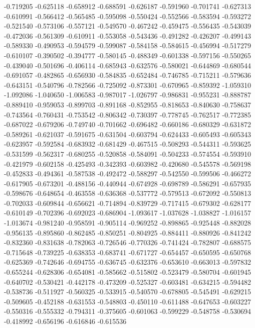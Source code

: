 -0.719205
-0.625118
-0.658912
-0.688591
-0.626187
-0.591960
-0.701741
-0.627313
-0.610991
-0.566412
-0.565485
-0.595098
-0.550424
-0.552566
-0.583594
-0.593272
-0.521540
-0.573106
-0.557121
-0.549570
-0.467242
-0.459475
-0.556435
-0.543039
-0.472036
-0.561309
-0.610911
-0.553058
-0.543436
-0.491282
-0.426207
-0.499143
-0.589330
-0.490953
-0.594579
-0.599087
-0.584158
-0.584615
-0.456994
-0.517279
-0.610107
-0.390502
-0.394777
-0.580145
-0.488349
-0.601338
-0.597156
-0.550265
-0.439040
-0.501696
-0.406114
-0.685943
-0.632576
-0.580021
-0.644869
-0.680544
-0.691057
-0.482865
-0.656930
-0.584835
-0.652484
-0.746785
-0.715211
-0.579636
-0.643151
-0.540796
-0.782566
-0.725092
-0.873301
-0.670965
-0.859392
-1.059310
-1.092086
-1.040650
-1.006583
-0.987017
-1.026797
-0.986831
-0.955231
-0.888787
-0.889410
-0.959053
-0.899703
-0.891168
-0.852955
-0.818653
-0.840630
-0.758637
-0.743564
-0.760431
-0.753542
-0.806342
-0.730397
-0.778745
-0.762517
-0.772385
-0.687022
-0.679206
-0.749740
-0.701662
-0.696482
-0.660186
-0.680329
-0.631872
-0.589261
-0.621037
-0.591675
-0.631504
-0.603794
-0.624433
-0.605493
-0.605343
-0.623957
-0.592584
-0.683932
-0.681429
-0.467515
-0.508293
-0.544311
-0.593625
-0.531599
-0.562317
-0.680255
-0.520858
-0.584091
-0.504233
-0.574554
-0.593910
-0.421979
-0.602158
-0.425493
-0.342393
-0.603982
-0.420680
-0.545578
-0.569198
-0.452833
-0.494361
-0.587538
-0.492472
-0.588297
-0.542550
-0.599506
-0.466272
-0.617905
-0.673201
-0.488156
-0.440944
-0.674928
-0.698789
-0.586291
-0.657935
-0.598676
-0.648654
-0.463558
-0.636368
-0.537772
-0.579513
-0.672092
-0.550813
-0.702033
-0.609844
-0.656621
-0.714894
-0.839729
-0.717415
-0.679302
-0.628177
-0.610149
-0.702396
-0.692023
-0.686904
-1.093617
-1.037628
-1.038827
-1.016157
-1.013674
-0.981240
-0.958591
-0.905114
-0.969252
-0.898865
-0.925448
-0.882028
-0.956135
-0.895860
-0.862485
-0.850251
-0.804925
-0.884411
-0.880926
-0.841242
-0.832360
-0.831638
-0.782063
-0.726546
-0.770326
-0.741424
-0.782807
-0.688575
-0.715648
-0.739225
-0.638353
-0.683741
-0.671727
-0.654457
-0.650595
-0.650768
-0.625369
-0.742646
-0.694755
-0.636745
-0.632376
-0.653610
-0.663013
-0.597832
-0.655244
-0.628306
-0.654081
-0.585662
-0.515802
-0.523479
-0.580704
-0.601945
-0.640702
-0.530421
-0.442178
-0.473209
-0.525327
-0.603481
-0.634215
-0.594482
-0.538736
-0.511927
-0.560325
-0.533915
-0.540570
-0.678805
-0.545491
-0.629215
-0.509605
-0.452188
-0.631553
-0.548803
-0.450110
-0.611488
-0.647653
-0.603227
-0.550316
-0.555332
-0.794311
-0.375605
-0.601063
-0.599229
-0.548758
-0.530694
-0.418992
-0.656196
-0.616846
-0.615536

